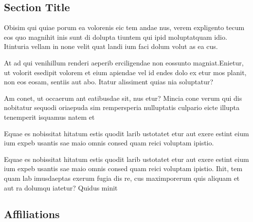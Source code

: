 \documentclass[
]{ImperialPoster}
\begin{document}
\begin{multicols}{3}
	\columnbreak{} %


	\section{Section Title}

	{
		\small %
		Obisim qui quiae porum ea volorenis eic tem andae nus, verem expligento tecum eos quo magnihit inis sunt di dolupta tiuntem qui ipid moluptatquam idio. Itinturia vellam in none velit quat landi ium faci dolum volut as ea cus.

		At ad qui venihillum renderi aeperib erciligendae non eossunto magniat.Enietur, ut volorit esedipit volorem et eium apiendae vel id endes dolo ex etur mos planit, non eos eosam, sentiis aut abo. Itatur alissiment quias nia soluptatur?

		Am conet, ut occaerum ant eatibusdae sit, nus etur? Mincia cone verum qui dis nobitatur sequodi oriaepuda sim rempersperia nulluptatis culpario eicte illupta tenemperit isquamus natem et\par
	}

	Equae es nobissitat hitatum estis quodit larib ustotatet \textcolor{ICLBlue}{etur aut exere estint eium ium expeb} usantis sae maio omnis consed quam reici voluptam ipistio.

	\vspace{0.31\textheight} %

	Equae es nobissitat hitatum estis quodit larib ustotatet etur aut exere estint eium ium expeb usantis sae maio omnis consed quam reici voluptam ipistio. Ihit, tem quam lab imusdaeptas exerum fugia dis re, cus maximporerum quis aliquam et aut ra dolumqu iatetur? Quidus minit

	\subsection{Affiliations}

	\\
	\\


\end{multicols}
\end{document}

